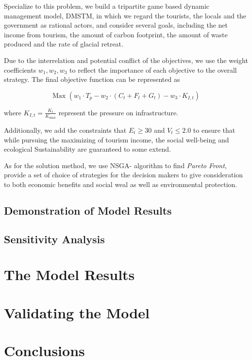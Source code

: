 \documentclass{mcmthesis}
\begin{document}
Specialize to this problem, we build a tripartite game based dynamic management model, DMSTM, in which 
we regard the tourists, the locals and the government as rational actors,
and consider several goals, including the net income from tourism, the amount of carbon footprint, 
the amount of waste produced and the rate of glacial retreat. 

Due to the interrelation and potential conflict of the objectives, we use the weight coefficients $w_1, w_2, w_3$ to reflect 
the importance of each objective to the overall strategy. The final objective function can be represented as 

\begin{equation}
  \text{Max }(w_1 \cdot T_p - w_2 \cdot (C_t + F_t + G_t) - w_3 \cdot K_{I,t})
\end{equation}

where $K_{I,t}=\frac{K_t}{K_{\text{max}}}$ represent the pressure on infrastructure.

Additionally, we add the constraints that $E_t \geq 30$ and $V_t \leq 2.0$ to ensure that
while pursuing the maximizing of tourism income, the social well-being and ecological Sustainability
are guaranteed to some extend.

As for the solution method, we use NSGA-\uppercase\expandafter{} algorithm to find
\emph{Pareto Front}, provide a set of choice of strategies for the decision makers to give consideration to
both economic benefits and social weal as well as environmental protection.

\subsection{Demonstration of Model Results}
\subsection{Sensitivity Analysis}
\section{The Model Results}

\section{Validating the Model}

\section{Conclusions}
\end{document}
